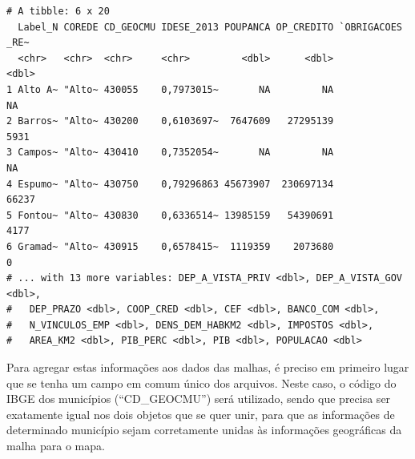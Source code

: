 \documentclass[12pt,brazil,oneside]{book}
\newenvironment{Shaded}{\begin{snugshade}}{\end{snugshade}}
\newcommand{\CommentTok}[1]{\textcolor[rgb]{0.56,0.35,0.01}{\textit{#1}}}
\newcommand{\DataTypeTok}[1]{\textcolor[rgb]{0.13,0.29,0.53}{#1}}
\newcommand{\DecValTok}[1]{\textcolor[rgb]{0.00,0.00,0.81}{#1}}
\newcommand{\KeywordTok}[1]{\textcolor[rgb]{0.13,0.29,0.53}{\textbf{#1}}}
\newcommand{\NormalTok}[1]{#1}
\newcommand{\OperatorTok}[1]{\textcolor[rgb]{0.81,0.36,0.00}{\textbf{#1}}}
\newcommand{\OtherTok}[1]{\textcolor[rgb]{0.56,0.35,0.01}{#1}}
\newcommand{\StringTok}[1]{\textcolor[rgb]{0.31,0.60,0.02}{#1}}
\begin{document}
\begin{Shaded}
\end{Shaded}

\begin{verbatim}
# A tibble: 6 x 20
  Label_N COREDE CD_GEOCMU IDESE_2013 POUPANCA OP_CREDITO `OBRIGACOES _RE~
  <chr>   <chr>  <chr>     <chr>         <dbl>      <dbl>            <dbl>
1 Alto A~ "Alto~ 430055    0,7973015~       NA         NA               NA
2 Barros~ "Alto~ 430200    0,6103697~  7647609   27295139             5931
3 Campos~ "Alto~ 430410    0,7352054~       NA         NA               NA
4 Espumo~ "Alto~ 430750    0,79296863 45673907  230697134            66237
5 Fontou~ "Alto~ 430830    0,6336514~ 13985159   54390691             4177
6 Gramad~ "Alto~ 430915    0,6578415~  1119359    2073680                0
# ... with 13 more variables: DEP_A_VISTA_PRIV <dbl>, DEP_A_VISTA_GOV <dbl>,
#   DEP_PRAZO <dbl>, COOP_CRED <dbl>, CEF <dbl>, BANCO_COM <dbl>,
#   N_VINCULOS_EMP <dbl>, DENS_DEM_HABKM2 <dbl>, IMPOSTOS <dbl>,
#   AREA_KM2 <dbl>, PIB_PERC <dbl>, PIB <dbl>, POPULACAO <dbl>
\end{verbatim}

Para agregar estas informações aos dados das malhas, é preciso em primeiro lugar que se tenha um campo em comum único dos arquivos. Neste caso, o código do IBGE dos municípios (``CD\_GEOCMU'') será utilizado, sendo que precisa ser exatamente igual nos dois objetos que se quer unir, para que as informações de determinado município sejam corretamente unidas às informações geográficas da malha para o mapa.
\end{document}
